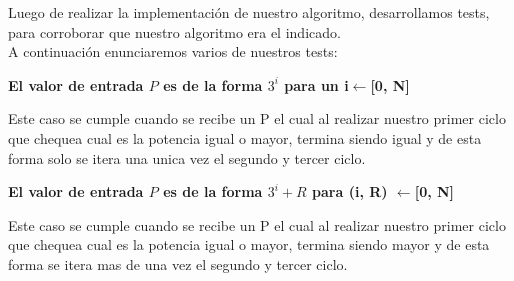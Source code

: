 \indent Luego de realizar la implementaci\'on de nuestro algoritmo, desarrollamos tests,
para corroborar que nuestro algoritmo era el indicado.\\

A continuaci\'on enunciaremos varios de nuestros tests:\\

\begin{center}
 \textbf{El valor de entrada $P$ es de la forma ${3^i}$ para un i$\gets$[0, N] }
\end{center}
 Este caso se cumple cuando se recibe un P el cual al realizar nuestro primer ciclo que chequea cual es la potencia igual o mayor, termina siendo igual y de esta forma solo se itera una unica vez el segundo y tercer ciclo.
 

\begin{center}
 \textbf{El valor de entrada $P$ es de la forma ${3^i} + R$ para  (i, R) $\gets$[0, N]}
\end{center}

 Este caso se cumple cuando se recibe un P el cual al realizar nuestro primer ciclo que chequea cual es la potencia igual o mayor, termina siendo mayor y de esta forma se itera mas de una vez el segundo y tercer ciclo.
